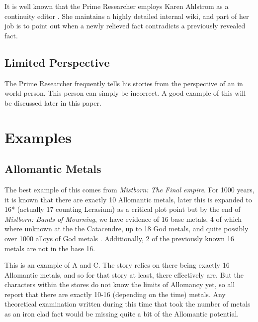\documentclass[conference]{IEEEtran}
\begin{document}
It is well known that the Prime Researcher employs Karen Ahlstrom as a continuity editor \cite{consistency}\cite{karen}.  She maintains a highly detailed internal wiki, and part of her job is to point out when a newly relieved fact contradicts a previously revealed fact. 

\subsection{Limited Perspective}
The Prime Researcher frequently tells his stories from the perspective of an in world person.  This person can simply be incorrect.  A good example of this will be discussed later in this paper.
\section{Examples}
\subsection{Allomantic Metals}
The best example of this comes from \emph{Mistborn: The Final empire}.  For 1000 years, it is known that there are exactly 10 Allomantic metals\cite{kelsier}, later this is expanded to 16* (actually 17 counting Lerasium) as a critical plot point\cite{16-metals} but by the end of \emph{Mistborn: Bands of Mourning}, we have evidence of 16 base metals, 4 of which where unknown at the the Catacendre, up to 18 God metals, and quite possibly over 1000 alloys of God metals \cite{bands}\cite{larasium}\cite{dor}.  Additionally, 2 of the previously known 16 metals are not in the base 16\cite{nalatium}.

This is an example of A and C.  The story relies on there being exactly 16 Allomantic metals, and so for that story at least, there effectively are.  But the characters within the stores do not know the limits of Allomancy yet, so all report that there are exactly 10-16 (depending on the time) metals.  Any theoretical examination written during this time that took the number of metals as an iron clad fact would be missing quite a bit of the Allomantic potential.
\end{document}
